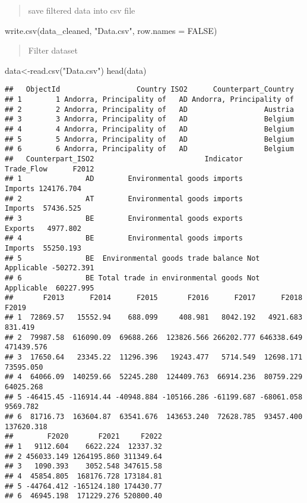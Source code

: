 \documentclass[
]{article}
\newenvironment{Shaded}{\begin{snugshade}}{\end{snugshade}}
\newcommand{\AttributeTok}[1]{\textcolor[rgb]{0.77,0.63,0.00}{#1}}
\newcommand{\ConstantTok}[1]{\textcolor[rgb]{0.00,0.00,0.00}{#1}}
\newcommand{\FunctionTok}[1]{\textcolor[rgb]{0.00,0.00,0.00}{#1}}
\newcommand{\NormalTok}[1]{#1}
\newcommand{\OtherTok}[1]{\textcolor[rgb]{0.56,0.35,0.01}{#1}}
\newcommand{\StringTok}[1]{\textcolor[rgb]{0.31,0.60,0.02}{#1}}
\begin{document}
\begin{quote}
save filtered data into csv file
\end{quote}

\begin{Shaded}
\begin{Highlighting}[]
\FunctionTok{write.csv}\NormalTok{(data\_cleaned, }\StringTok{"Data.csv"}\NormalTok{, }\AttributeTok{row.names =} \ConstantTok{FALSE}\NormalTok{)}
\end{Highlighting}
\end{Shaded}

\begin{quote}
Filter dataset
\end{quote}

\begin{Shaded}
\begin{Highlighting}[]
\NormalTok{data}\OtherTok{\textless{}{-}}\FunctionTok{read.csv}\NormalTok{(}\StringTok{"Data.csv"}\NormalTok{)}
\FunctionTok{head}\NormalTok{(data)}
\end{Highlighting}
\end{Shaded}

\begin{verbatim}
##   ObjectId                  Country ISO2      Counterpart_Country
## 1        1 Andorra, Principality of   AD Andorra, Principality of
## 2        2 Andorra, Principality of   AD                  Austria
## 3        3 Andorra, Principality of   AD                  Belgium
## 4        4 Andorra, Principality of   AD                  Belgium
## 5        5 Andorra, Principality of   AD                  Belgium
## 6        6 Andorra, Principality of   AD                  Belgium
##   Counterpart_ISO2                          Indicator     Trade_Flow      F2012
## 1               AD        Environmental goods imports        Imports 124176.704
## 2               AT        Environmental goods imports        Imports  57436.525
## 3               BE        Environmental goods exports        Exports   4977.802
## 4               BE        Environmental goods imports        Imports  55250.193
## 5               BE  Environmental goods trade balance Not Applicable -50272.391
## 6               BE Total trade in environmental goods Not Applicable  60227.995
##       F2013      F2014      F2015       F2016      F2017      F2018      F2019
## 1  72869.57   15552.94    688.099     408.981   8042.192   4921.683    831.419
## 2  79987.58  616090.09  69688.266  123826.566 266202.777 646338.649 471439.576
## 3  17650.64   23345.22  11296.396   19243.477   5714.549  12698.171  73595.050
## 4  64066.09  140259.66  52245.280  124409.763  66914.236  80759.229  64025.268
## 5 -46415.45 -116914.44 -40948.884 -105166.286 -61199.687 -68061.058   9569.782
## 6  81716.73  163604.87  63541.676  143653.240  72628.785  93457.400 137620.318
##        F2020       F2021     F2022
## 1   9112.604    6622.224  12337.32
## 2 456033.149 1264195.860 311349.64
## 3   1090.393    3052.548 347615.58
## 4  45854.805  168176.728 173184.81
## 5 -44764.412 -165124.180 174430.77
## 6  46945.198  171229.276 520800.40
\end{verbatim}
\end{document}
